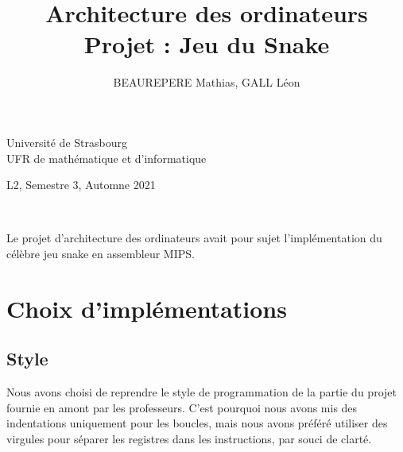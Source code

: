 \documentclass[a4paper]{article}
\title{Architecture des ordinateurs\\\large Projet : Jeu du Snake}
\author{BEAUREPERE Mathias, GALL Léon}
\date{}
\begin{document}
\hspace{-0.5cm}\begin{minipage}{0.5\textwidth}
Université de Strasbourg\\
UFR de mathématique et d'informatique
\end{minipage}
\hspace*{\fill}\begin{minipage}{0.5\textwidth}
\hspace*{\fill}L2, Semestre 3, Automne 2021\\
\hspace*{\fill}\@author
\end{minipage}
\\
\begin{center}
  \huge \@title
\end{center}
\vspace*{1cm}


Le projet d'architecture des ordinateurs avait pour sujet l'implémentation du célèbre jeu snake en assembleur MIPS.

\section{Choix d'implémentations}

\subsection{Style}
Nous avons choisi  de reprendre le style de programmation de la partie du projet fournie en amont par les professeurs.
C'est pourquoi nous avons mis des indentations uniquement pour les boucles, mais nous avons préféré utiliser des virgules
pour séparer les registres dans les instructions, par souci de clarté.
\end{document}
